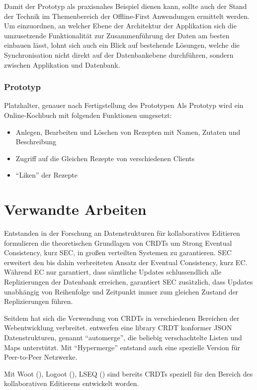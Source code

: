 \documentclass[a4paper, 12pt]{scrreprt}
\newcommand\klammercite[1]{%
	(\citealt{#1})}
\begin{document}
Damit der Prototyp als praxisnahes Beispiel dienen kann, sollte auch der Stand der Technik im Themenbereich der Offline-First Anwendungen ermittelt werden. Um einzuordnen, an welcher Ebene der Architektur der Applikation sich die umzusetzende Funktionalität zur Zusammenführung der Daten am besten einbauen lässt, lohnt sich auch ein Blick auf bestehende Lösungen, welche die Synchronisation nicht direkt auf der Datenbankebene durchführen, sondern zwischen Applikation und Datenbank.

\subsection{Prototyp}
Platzhalter, genauer nach Fertigstellung des Prototypen
Als Prototyp wird ein Online-Kochbuch mit folgenden Funktionen umgesetzt:
\begin{itemize}
	\item Anlegen, Bearbeiten und Löschen von Rezepten mit Namen, Zutaten und Beschreibung
	\item Zugriff auf die Gleichen Rezepte von verschiedenen Clients
	\item \enquote{Liken} der Rezepte
\end{itemize}

\chapter{Verwandte Arbeiten}
Entstanden in der Forschung an Datenstrukturen für kollaboratives Editieren formulieren \citet{InproceedingsCRDTOriginal} die theoretischen Grundlagen von CRDTs um Strong Eventual Consistency, kurz SEC, in großen verteilten Systemen zu garantieren. SEC erweitert den bis dahin verbreiteten Ansatz der Eventual Consistency, kurz EC. Während EC nur garantiert, dass sämtliche Updates schlussendlich alle Replizierungen der Datenbank erreichen, garantiert SEC zusätzlich, dass Updates unabhängig von Reihenfolge und Zeitpunkt immer zum gleichen Zustand der Replizierungen führen.

Seitdem hat sich die Verwendung von CRDTs in verschiedenen Bereichen der Webentwicklung verbreitet. \citet{ArticleCRDTJSON} entwerfen eine library CRDT konformer JSON Datenstrukturen, genannt \enquote{automerge}, die beliebig verschachtelte Listen und Maps unterstützt. Mit \enquote{Hypermerge} entstand auch eine spezielle Version für Peer-to-Peer Netzwerke.

Mit Woot\klammercite{InproceedingsCRDTWoot}, Logoot\klammercite{InproceedingsCRDTLogoot}, LSEQ\klammercite{InproceedingsCRDTLSEQ} sind bereits CRDTs speziell für den Bereich des kollaborativen Editierens entwickelt worden.\\ 
\end{document}
